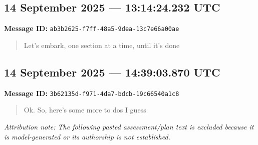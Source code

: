 \documentclass[11pt,letterpaper]{article}
\newcommand{\messageentry}[3]{%
  \Needspace{7\baselineskip}
  \subsection*{#1}
  {\small\textbf{Message ID:} \texttt{#2}}
  \vspace{2pt}
}
\begin{document}
\messageentry{14 September 2025 --- 13:14:24.232 UTC}{ab3b2625-f7ff-48a5-9dea-13c7e66a00ae}{}
\begin{quote}\small
Let’s embark, one section at a time, until it’s done 
\end{quote}

\messageentry{14 September 2025 --- 14:39:03.870 UTC}{3b62135d-f971-4da7-bdcb-19c66540a1c8}{}
\begin{quote}\small
Ok. So, here’s some more to dos I guess
\end{quote}
{\small\emph{Attribution note: The following pasted assessment/plan text is excluded because it is model-generated or its authorship is not established.}}
\end{document}

